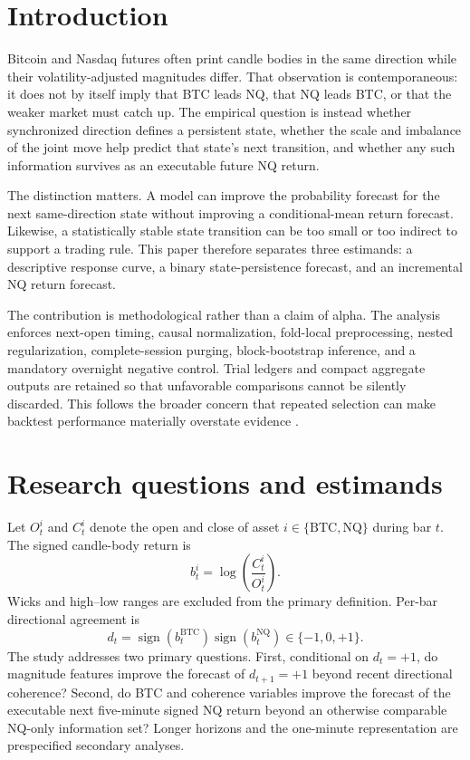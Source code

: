 \documentclass[11pt]{article}
\newcommand{\BTC}{\mathrm{BTC}}
\newcommand{\NQ}{\mathrm{NQ}}
\begin{document}
\section{Introduction}

Bitcoin and Nasdaq futures often print candle bodies in the same direction while their
volatility-adjusted magnitudes differ. That observation is contemporaneous: it does not
by itself imply that BTC leads NQ, that NQ leads BTC, or that the weaker market must catch
up. The empirical question is instead whether synchronized direction defines a persistent
state, whether the scale and imbalance of the joint move help predict that state's next
transition, and whether any such information survives as an executable future NQ return.

The distinction matters. A model can improve the probability forecast for the next
same-direction state without improving a conditional-mean return forecast. Likewise, a
statistically stable state transition can be too small or too indirect to support a
trading rule. This paper therefore separates three estimands: a descriptive response
curve, a binary state-persistence forecast, and an incremental NQ return forecast.

The contribution is methodological rather than a claim of alpha. The analysis enforces
next-open timing, causal normalization, fold-local preprocessing, nested regularization,
complete-session purging, block-bootstrap inference, and a mandatory overnight negative
control. Trial ledgers and compact aggregate outputs are retained so that unfavorable
comparisons cannot be silently discarded. This follows the broader concern that repeated
selection can make backtest performance materially overstate evidence
\cite{bailey2014deflated,bailey2017pbo,lopezdeprado2018}.

\section{Research questions and estimands}

Let $O^i_t$ and $C^i_t$ denote the open and close of asset $i\in\{\BTC,\NQ\}$ during bar
$t$. The signed candle-body return is
\begin{equation}
  b^i_t = \log\!\left(\frac{C^i_t}{O^i_t}\right).
  \label{eq:body}
\end{equation}
Wicks and high--low ranges are excluded from the primary definition. Per-bar directional
agreement is
\begin{equation}
  d_t = \operatorname{sign}(b^{\BTC}_t)\operatorname{sign}(b^{\NQ}_t)
  \in\{-1,0,+1\}.
  \label{eq:agreement}
\end{equation}
The study addresses two primary questions. First, conditional on $d_t=+1$, do magnitude
features improve the forecast of $d_{t+1}=+1$ beyond recent directional coherence?
Second, do BTC and coherence variables improve the forecast of the executable next
five-minute signed NQ return beyond an otherwise comparable NQ-only information set?
Longer horizons and the one-minute representation are prespecified secondary analyses.
\end{document}
